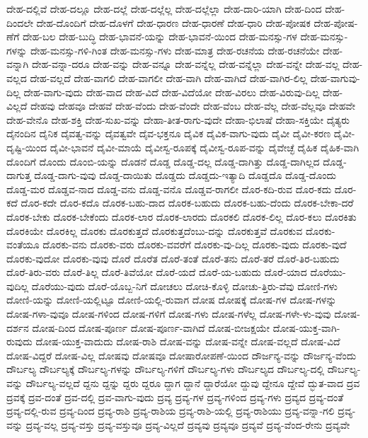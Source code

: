 {ದೇಹ-ದಲ್ಲಿವೆ
ದೇಹ-ದಲ್ಲೂ
ದೇಹ-ದಲ್ಲೆ
ದೇಹ-ದಲ್ಲೆಲ್ಲ
ದೇಹ-ದಲ್ಲೆಲ್ಲಾ
ದೇಹ-ದಾರಿ-ಯಾಗಿ
ದೇಹ-ದಿಂದ
ದೇಹ-ದಿಂದಲೇ
ದೇಹ-ದೊಂದಿಗೆ
ದೇಹ-ದೊಳಗೆ
ದೇಹ-ಧಾರಣ
ದೇಹ-ಧಾರಣೆ
ದೇಹ-ಧಾರಿ
ದೇಹ-ಪೋಷಕ
ದೇಹ-ಪೋಷ-ಣೆಗೆ
ದೇಹ-ಬಲ
ದೇಹ-ಬುದ್ಧಿ
ದೇಹ-ಭಾವನೆ-ಯನ್ನು
ದೇಹ-ಭಾವನೆ-ಯಿಂದ
ದೇಹ-ಮನಸ್ಸು-ಗಳ
ದೇಹ-ಮನಸ್ಸು-ಗಳನ್ನು
ದೇಹ-ಮನಸ್ಸು-ಗಳಿ-ಗಿಂತ
ದೇಹ-ಮನಸ್ಸು-ಗಳು
ದೇಹ-ಮಾತ್ರ
ದೇಹ-ರಚನೆಯ
ದೇಹ-ರಚನೆಯೇ
ದೇಹ-ವನ್ನಾಗಿ
ದೇಹ-ವನ್ನಾ-ದರೂ
ದೇಹ-ವನ್ನು
ದೇಹ-ವನ್ನೂ
ದೇಹ-ವನ್ನೆಲ್ಲ
ದೇಹ-ವನ್ನೆಲ್ಲಾ
ದೇಹ-ವನ್ನೇ
ದೇಹ-ವಲ್ಲ
ದೇಹ-ವಲ್ಲದ
ದೇಹ-ವಲ್ಲದೆ
ದೇಹ-ವಾಗಲಿ
ದೇಹ-ವಾಗಲೀ
ದೇಹ-ವಾಗಿ
ದೇಹ-ವಾಗಿದೆ
ದೇಹ-ವಾಗಿರ-ಲಿಲ್ಲ
ದೇಹ-ವಾಗುವು-ದಿಲ್ಲ
ದೇಹ-ವಾಗು-ವುದು
ದೇಹ-ವಾದ
ದೇಹ-ವಿದೆ
ದೇಹ-ವಿದೆಯೋ
ದೇಹ-ವಿರಲು
ದೇಹ-ವಿರುವು-ದಿಲ್ಲ
ದೇಹ-ವಿಲ್ಲದೆ
ದೇಹವು
ದೇಹವೂ
ದೇಹವೆ
ದೇಹ-ವೆಂದು
ದೇಹ-ವೆಂದೇ
ದೇಹ-ವೆಂಬ
ದೇಹ-ವೆಲ್ಲ
ದೇಹ-ವೆಲ್ಲವೂ
ದೇಹವೇ
ದೇಹ-ವೇನೊ
ದೇಹ-ಶಕ್ತಿ
ದೇಹ-ಸುಖ-ವನ್ನು
ದೇಹಾ-ತೀತ-ರಾಗು-ವುದೇ
ದೇಹಾ-ಭಿಲಾಷೆ
ದೇಹಾ-ಸಕ್ತಿಯೇ
ದೈತ್ಯರು
ದೈನಂದಿನ
ದೈನಿಕ
ದೈವತ್ವ-ವನ್ನು
ದೈವತ್ವವೇ
ದೈವ-ಭಕ್ತನೂ
ದೈವಿಕ
ದೈವಿಕ-ವಾಗು-ವುದು
ದೈವೀ
ದೈವೀ-ಕರಣ
ದೈವೀ-ದೃಷ್ಟಿ-ಯಿಂದ
ದೈವೀ-ಭಾವನೆ
ದೈವೀ-ಮಾಯೆ
ದೈವೀಸ್ವ-ರೂಪಕ್ಕೆ
ದೈವೀಸ್ವ-ರೂಪ-ವನ್ನು
ದೈವೇಚ್ಛೆ
ದೈಹಿಕ
ದೈಹಿಕ-ವಾಗಿ
ದೊಂದಿಗೆ
ದೊಂದು
ದೊಂಬಿ-ಯನ್ನು
ದೊಡನೆ
ದೊಡ್ಡ
ದೊಡ್ಡ-ದಲ್ಲ
ದೊಡ್ಡ-ದಾಗಿತ್ತು
ದೊಡ್ಡ-ದಾಗಿಲ್ಲದ
ದೊಡ್ಡ-ದಾಗುತ್ತ
ದೊಡ್ಡ-ದಾಗು-ವುವು
ದೊಡ್ಡ-ದಾಯಿತು
ದೊಡ್ಡದು
ದೊಡ್ಡದು-ಇತ್ಯಾದಿ
ದೊಡ್ಡದೊ
ದೊಡ್ಡ-ದೊಂದು
ದೊಡ್ಡ-ಮರ
ದೊಡ್ಡವ-ನಾದ
ದೊಡ್ಡ-ವನು
ದೊಡ್ಡ-ವನೊ
ದೊಡ್ಡವ-ರಾಗಲೀ
ದೊರ-ಕದಿ-ರುವ
ದೊರ-ಕದು
ದೊರ-ಕದೆ
ದೊರ-ಕದೇ
ದೊರ-ಕದೊ
ದೊರಕ-ಬಹು-ದಾದ
ದೊರಕ-ಬಹುದು
ದೊರಕ-ಬಹು-ದೆಂದು
ದೊರಕ-ಬೇಕಾ-ದರೆ
ದೊರಕ-ಬೇಕು
ದೊರಕ-ಬೇಕೆಂದು
ದೊರಕ-ಲಾರ
ದೊರಕ-ಲಾರದು
ದೊರಕಲಿ
ದೊರಕ-ಲಿಲ್ಲ
ದೊರ-ಕಲು
ದೊರಕಿತು
ದೊರಕಿಯೇ
ದೊರಕಿಲ್ಲ
ದೊರಕು
ದೊರಕುತ್ತದೆ
ದೊರಕುತ್ತದೆಂಬು-ದನ್ನು
ದೊರಕುತ್ತವೆ
ದೊರಕುವ
ದೊರಕು-ವಂತೆಯೂ
ದೊರಕು-ವನು
ದೊರಕು-ವರು
ದೊರಕು-ವವರೆಗೆ
ದೊರಕು-ವು-ದಿಲ್ಲ
ದೊರಕು-ವುದು
ದೊರಕು-ವುದೆ
ದೊರಕು-ವುದೋ
ದೊರಕು-ವುವು
ದೊರೆ
ದೊರೆತ
ದೊರೆ-ತಂತೆ
ದೊರೆ-ತನು
ದೊರೆ-ತರೆ
ದೊರೆ-ತಿರ-ಬಹುದು
ದೊರೆ-ತಿರು-ವರು
ದೊರೆ-ತಿಲ್ಲ
ದೊರೆ-ತಿವೆಯೋ
ದೊರೆ-ಯದೆ
ದೊರೆ-ಯ-ಬಹುದು
ದೊರೆ-ಯಾದ
ದೊರೆಯು-ವುದಿಲ್ಲ
ದೊರೆಯು-ವುದು
ದೊರೆ-ಯೊಬ್ಬ-ನಿಗೆ
ದೋಚಲು
ದೋಚಿ-ಕೊಳ್ಳಿ
ದೋಚು-ತ್ತಿರು-ವೆವು
ದೋಣಿ-ಗಳು
ದೋಣಿ-ಯನ್ನು
ದೋಣಿ-ಯಲ್ಲಿಟ್ಟೂ
ದೋಣಿ-ಯಲ್ಲಿ-ರುವಾಗ
ದೋಷ
ದೋಷಕ್ಕೆ
ದೋಷ-ಗಳ
ದೋಷ-ಗಳನ್ನು
ದೋಷ-ಗಳಾ-ವುವೂ
ದೋಷ-ಗಳಿಂದ
ದೋಷ-ಗಳಿಗೆ
ದೋಷ-ಗಳು
ದೋಷ-ಗಳೆಲ್ಲ
ದೋಷ-ಗಳೇ-ಳು-ವುವು
ದೋಷ-ದರ್ಶನ
ದೋಷ-ದಿಂದ
ದೋಷ-ಪೂರ್ಣ
ದೋಷ-ಪೂರ್ಣ-ವಾಗಿದೆ
ದೋಷ-ಬೀಜಕ್ಷಯೇ
ದೋಷ-ಯುಕ್ತ-ವಾಗಿ-ರುವುದು
ದೋಷ-ಯುಕ್ತ-ವಾದುದು
ದೋಷ-ರಾಶಿ
ದೋಷ-ವನ್ನು
ದೋಷ-ವನ್ನೇ
ದೋಷ-ವಲ್ಲದೆ
ದೋಷ-ವಿದೆ
ದೋಷ-ವಿದ್ದರೆ
ದೋಷ-ವಿಲ್ಲ
ದೋಷವು
ದೋಷವೂ
ದೋಷಾರೋಪಣೆ-ಯಿಂದ
ದೌರ್ಜನ್ಯ-ವನ್ನು
ದೌರ್ಜನ್ಯ-ವೆಂದು
ದೌರ್ಬಲ್ಯ
ದೌರ್ಬಲ್ಯಕ್ಕೆ
ದೌರ್ಬಲ್ಯ-ಗಳನ್ನು
ದೌರ್ಬಲ್ಯ-ಗಳಿಗೆ
ದೌರ್ಬಲ್ಯ-ಗಳು
ದೌರ್ಬಲ್ಯದ
ದೌರ್ಬಲ್ಯ-ದಲ್ಲಿ
ದೌರ್ಬಲ್ಯ-ವನ್ನು
ದೌರ್ಬಲ್ಯ-ವಲ್ಲದೆ
ದ್ದನು
ದ್ದನ್ನು
ದ್ದರು
ದ್ದರೂ
ದ್ದಾಗ
ದ್ದಾನೆ
ದ್ದಾರೆಯೋ
ದ್ದುವು
ದ್ದೇನೂ
ದ್ದೇವೆ
ದ್ಭುತ-ವಾದ
ದ್ರವ
ದ್ರವಕ್ಕೆ
ದ್ರವ-ದಂತೆ
ದ್ರವ-ದಲ್ಲಿ
ದ್ರವ-ವಾಗು-ವುದು
ದ್ರವ್ಯ
ದ್ರವ್ಯ-ಗಳ
ದ್ರವ್ಯ-ಗಳಿಂದ
ದ್ರವ್ಯ-ಗಳು
ದ್ರವ್ಯದ
ದ್ರವ್ಯ-ದಂತೆ
ದ್ರವ್ಯ-ದಲ್ಲಿ-ರುವ
ದ್ರವ್ಯ-ದಿಂದ
ದ್ರವ್ಯ-ರಾಶಿ
ದ್ರವ್ಯ-ರಾಶಿಯ
ದ್ರವ್ಯ-ರಾಶಿ-ಯಲ್ಲಿ
ದ್ರವ್ಯ-ರಾಶಿಯು
ದ್ರವ್ಯ-ವನ್ನಾ-ಗಲಿ
ದ್ರವ್ಯ-ವನ್ನು
ದ್ರವ್ಯ-ವಲ್ಲ
ದ್ರವ್ಯ-ವಸ್ತು
ದ್ರವ್ಯ-ವಸ್ತುವೂ
ದ್ರವ್ಯ-ವಿಲ್ಲದೆ
ದ್ರವ್ಯವು
ದ್ರವ್ಯವೂ
ದ್ರವ್ಯವೆ
ದ್ರವ್ಯ-ವೆಂದ-ರೇನು
ದ್ರವ್ಯವೇ
}
